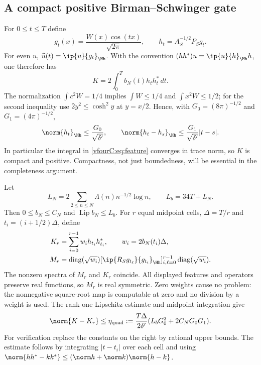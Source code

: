 \subsection{A compact positive Birman--Schwinger gate}
\label{vfourC:subsec:matrix}

For $0\le t\le T$ define
\[
 g_t(x)=\frac{W(x)\cos(tx)}{\sqrt{2\pi}},\qquad
 h_t=A_S^{-1/2}P_Sg_t.
\]
For even $u$, $\widehat u(t)=\ip{u}{g_t}_{\Hh}$.  With the convention
$(hh^*)u=\ip{u}{h}_{\Hh}h$, one therefore has
\begin{equation}\label{vfourC:eq:feature}
 K=2\int_0^T b_N(t)h_th_t^*\,dt.
\end{equation}
The normalization $\int c^2W=1/4$ implies
$\int W\le1/4$ and $\int x^2W\le1/2$; for the second inequality use
$2y^2\le\cosh^2y$ at $y=x/2$.  Hence, with
$G_0=(8\pi)^{-1/2}$ and $G_1=(4\pi)^{-1/2}$,
\begin{equation}\label{vfourC:eq:feature-bounds}
 \norm{h_t}_{\Hh}\le\frac{G_0}{\sqrt{\delta'}},\qquad
 \norm{h_t-h_s}_{\Hh}\le\frac{G_1}{\sqrt{\delta'}}|t-s|.
\end{equation}
In particular the integral in \eqref{vfourC:eq:feature} converges in trace norm,
so $K$ is compact and positive.  Compactness, not just boundedness, will be
essential in the completeness argument.

Let
\[
 L_N=2\sum_{2\le n\le N}\Lambda(n)n^{-1/2}\log n,
 \qquad L_b=34T+L_N.
\]
Then $0\le b_N\le C_N$ and $\operatorname{Lip}b_N\le L_b$.  For $r$ equal
midpoint cells, $\Delta=T/r$ and $t_i=(i+1/2)\Delta$, define
\begin{align}
 K_r&=\sum_{i=0}^{r-1}w_i h_{t_i}h_{t_i}^*,
       \qquad w_i=2b_N(t_i)\Delta,\label{vfourC:eq:finite-K}\\
 M_r&=\operatorname{diag}(\sqrt{w_i})
     [\ip{R_Sg_{t_\ell}}{g_{t_i}}_{\Hh}]_{i,\ell=0}^{r-1}
       \operatorname{diag}(\sqrt{w_i}).\label{vfourC:eq:finite-M}
\end{align}
The nonzero spectra of $M_r$ and $K_r$ coincide.  All displayed features and
operators preserve real functions, so $M_r$ is real symmetric.  Zero weights
cause no problem: the nonnegative square-root map is computable at zero and
no division by a weight is used.  The rank-one Lipschitz estimate and midpoint
integration give
\begin{equation}\label{vfourC:eq:quadrature}
 \norm{K-K_r}\le\eta_{\mathrm{quad}}
 :=\frac{T\Delta}{2\delta'}
       (L_bG_0^2+2C_NG_0G_1).
\end{equation}
For verification replace the constants on the right by rational upper bounds.
The estimate follows by integrating $|t-t_i|$ over each cell and using
$\norm{hh^*-kk^*}\le(\norm h+\norm k)\norm{h-k}$.

